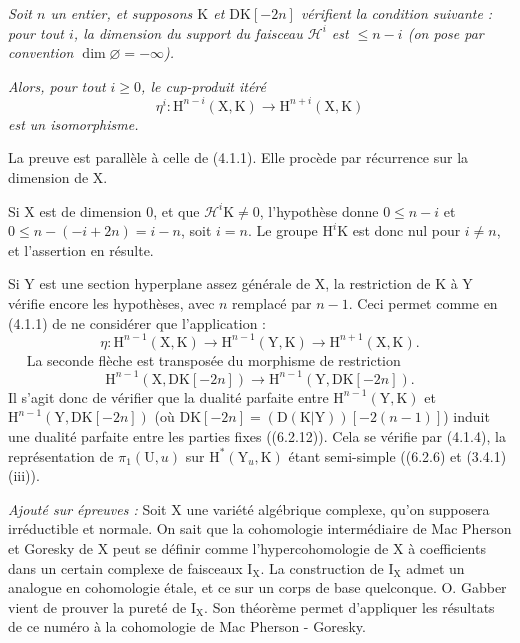 \documentclass[11pt,leqno]{article}
\newcommand{\Page}[1]{\ifvmode\noindent\else\unskip\ \fi{\footnotesize\textcolor{gray}{[p.\,#1]}}\ \ignorespaces}
\begin{document}
\textit{Soit \(n\) un entier, et supposons \(\mathrm{K}\) et \(\mathrm{DK}[-2n]\) vérifient la condition suivante : pour tout \(i\), la dimension du support du faisceau \(\mathscr{H}^i\) est \(\leq n-i\) (on pose par convention \(\dim\varnothing=-\infty\)).}

\textit{Alors, pour tout \(i\geq0\), le cup-produit itéré}
\[
\eta^i:\mathrm{H}^{n-i}(\mathrm{X},\mathrm{K})
\to
\mathrm{H}^{n+i}(\mathrm{X},\mathrm{K})
\]
\textit{est un isomorphisme.}

\medskip
La preuve est parallèle à celle de (4.1.1). Elle procède par récurrence sur la dimension de \(\mathrm{X}\).

Si \(\mathrm{X}\) est de dimension \(0\), et que \(\mathscr{H}^i\mathrm{K}\neq0\), l’hypothèse donne \(0\leq n-i\) et \(0\leq n-(-i+2n)=i-n\), soit \(i=n\). Le groupe \(\mathrm{H}^i\mathrm{K}\) est donc nul pour \(i\neq n\), et l’assertion en résulte.

Si \(\mathrm{Y}\) est une section hyperplane assez générale de \(\mathrm{X}\), la restriction de \(\mathrm{K}\) à \(\mathrm{Y}\) vérifie encore les hypothèses, avec \(n\) remplacé par \(n-1\). Ceci permet comme en (4.1.1) de ne considérer que l’application :
\[
\eta:\mathrm{H}^{n-1}(\mathrm{X},\mathrm{K})
\to
\mathrm{H}^{n-1}(\mathrm{Y},\mathrm{K})
\to
\mathrm{H}^{n+1}(\mathrm{X},\mathrm{K}).
\]
\Page{251}
La seconde flèche est transposée du morphisme de restriction
\[
\mathrm{H}^{n-1}(\mathrm{X},\mathrm{DK}[-2n])
\to
\mathrm{H}^{n-1}(\mathrm{Y},\mathrm{DK}[-2n]).
\]
Il s’agit donc de vérifier que la dualité parfaite entre \(\mathrm{H}^{n-1}(\mathrm{Y},\mathrm{K})\) et \(\mathrm{H}^{n-1}(\mathrm{Y},\mathrm{DK}[-2n])\) (où \(\mathrm{DK}[-2n]=(\mathrm{D}(\mathrm{K}|\mathrm{Y}))[-2(n-1)]\)) induit une dualité parfaite entre les parties fixes ((6.2.12)). Cela se vérifie par (4.1.4), la représentation de \(\pi_1(\mathrm{U},u)\) sur \(\mathrm{H}^*(\mathrm{Y}_u,\mathrm{K})\) étant semi-simple ((6.2.6) et (3.4.1) (iii)).

\medskip
\textit{Ajouté sur épreuves :} Soit \(\mathrm{X}\) une variété algébrique complexe, qu’on supposera irréductible et normale. On sait que la cohomologie intermédiaire de Mac Pherson et Goresky de \(\mathrm{X}\) peut se définir comme l’hypercohomologie de \(\mathrm{X}\) à coefficients dans un certain complexe de faisceaux \(\mathrm{I}_{\mathrm{X}}\). La construction de \(\mathrm{I}_{\mathrm{X}}\) admet un analogue en cohomologie étale, et ce sur un corps de base quelconque. O. Gabber vient de prouver la pureté de \(\mathrm{I}_{\mathrm{X}}\). Son théorème permet d’appliquer les résultats de ce numéro à la cohomologie de Mac Pherson - Goresky.
\end{document}
